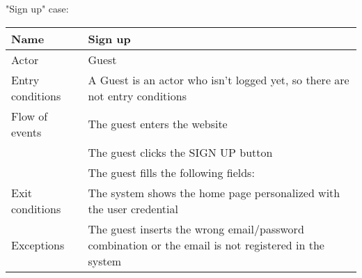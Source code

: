 "Sign up" case:

\begin{tabular}{|l|l|} 
\hline
Name & Sign up\\
\hline
Actor & Guest\\
\hline
Entry conditions & A Guest is an actor who isn't logged yet, so there are not entry conditions\\
\hline
Flow of events
			&	\tabitem The guest enters the website\\
			&	\tabitem The guest clicks the SIGN UP button\\
			&	\tabitem The guest fills the following fields:\\
\hline
Exit conditions & The system shows the home page personalized with the user credential\\
\hline
Exceptions & The guest inserts the wrong email/password combination or the email is not registered in the system\\
\hline
\end {tabular}

